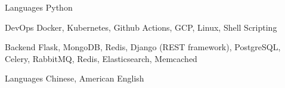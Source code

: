 

\begin{cvskills}

  \cvskill
    {Languages} %
    {Python} %

  \cvskill
    {DevOps} %
    {Docker, Kubernetes, Github Actions, GCP, Linux, Shell Scripting} %

  \cvskill
    {Backend} %
    {Flask, MongoDB, Redis, Django (REST framework), PostgreSQL, Celery, RabbitMQ, Redis, Elasticsearch, Memcached} %


  \cvskill
    {Languages} %
    {Chinese, American English} %

\end{cvskills}
